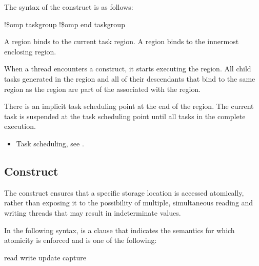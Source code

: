 \fortranspecificstart
The syntax of the  construct is as follows:

\begin{boxedcode}
!\$omp taskgroup
!\$omp end taskgroup
\end{boxedcode}
\fortranspecificend

\binding
A  region binds to the current task region. A  region binds to 
the innermost enclosing  region. 

\descr
When a thread encounters a  construct, it starts executing 
the region. All child tasks generated in the  region and all 
of their descendants that bind to the same  region as the 
 region are part of the  associated with 
the  region.

There is an implicit task scheduling point at the end of the  
region. The current task is suspended at the task scheduling point until all 
tasks in the  complete execution.

\crossreferences
\begin{itemize}
\item Task scheduling, see 
.
\end{itemize}










\subsection{ Construct}
\label{subsec:atomic Construct}
\summary
The  construct ensures that a specific storage location is accessed atomically, 
rather than exposing it to the possibility of multiple, simultaneous reading and writing 
threads that may result in indeterminate values.

\syntax
In the following syntax,  is a clause that indicates
the semantics for which atomicity is enforced and is one of the following:

\begin{indentedcodelist}
read
write
update
capture
\end{indentedcodelist}


